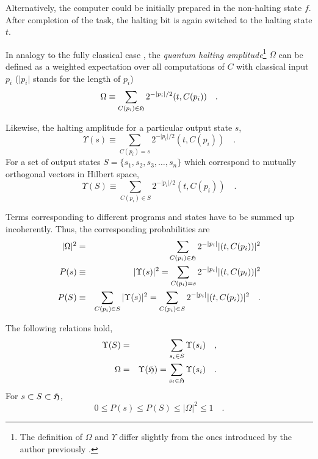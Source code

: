 Alternatively, the computer could be initially prepared
in the non-halting state $f $.
After completion of the
task, the halting bit is again
switched to
the halting state $ t$.



In analogy to the fully classical case
\cite{chaitin2,chaitin3,solomonoff,calude:94},
the {\em quantum halting amplitude}\footnote{
The definition of $\Omega$ and $\Upsilon$ differ slightly from the ones
introduced by the author previously \cite{quantum-omega}.
}
 $\Omega $ can be defined
 as a weighted expectation over all computations of $C$ with classical
input
$p_i$ ($\vert p_i\vert $ stands for the length of $p_i$)
 \begin{equation}
   \Omega \equiv
\sum_{C(p_i)\in {\cal H}}
2^{-\vert p_i\vert/2
}
 (  t,   C(p_i) )
\quad .
\label{e:qo}
 \end{equation}

Likewise, the halting amplitude for a particular output state
$ s
$,
 \begin{equation}
  \Upsilon ( s )  \equiv
\sum_{ C(p_i) = s }
2^{-\vert p_i\vert /2
}
( t,C(p_i) )
\quad .
\label{e:qop}
 \end{equation}
For a set of output states
 $S=\{
s_1 ,
s_2 ,
s_3 ,
\ldots
, s_n\}$
 which correspond to mutually orthogonal
vectors in Hilbert space,
 \begin{equation}
  \Upsilon ( S )  \equiv
\sum_{ C(p_i) \in S }
2^{-\vert p_i\vert   /2
}
( t,  C(p_i) )
\quad .
\label{e:qop1}
 \end{equation}

Terms corresponding to different programs and states have to be summed
up incoherently.
Thus, the corresponding probabilities are
 \begin{eqnarray}
\vert \Omega \vert^2&=& \sum_{C(p_i)\in {\cal  H}}
2^{-\vert p_i\vert
}
\vert (  t,   C(p_i) ) \vert^2\\
P(s)&\equiv &
\vert \Upsilon
(s)\vert^2 =
\sum_{C(p_i)=s}
2^{-\vert p_i\vert
}
\vert (  t,   C(p_i) ) \vert^2\\
P(S)&\equiv &
\sum_{C(p_i)\in S}
\vert \Upsilon
(s)\vert^2 =
\sum_{C(p_i)\in S}
2^{-\vert p_i\vert
}
\vert (  t,   C(p_i) ) \vert^2
\quad .
 \end{eqnarray}

The following relations hold,
 \begin{eqnarray}
  \Upsilon ( S )  &=&\sum_{s_i\in S} \Upsilon (s_i)\quad ,\\
\Omega  &=&\Upsilon( {\cal H})=\sum_{s_i\in {\cal  H}} \Upsilon
(s_i)\quad .
 \end{eqnarray}
For $s\subset S\subset {\cal H}$,
\begin{equation}
0\le P(s)\le P(S)\le \vert \Omega \vert^2 \le 1
\quad .
\label{e:qop11}
\end{equation}


